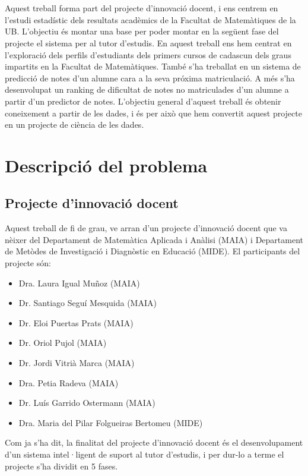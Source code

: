 \documentclass[12pt,a4paper,catalan]{article}
\begin{document}
\\
\\
Aquest treball forma part del projecte d'innovació docent, i ens centrem en l'estudi estadístic dels resultats acadèmics de la Facultat de Matemàtiques de la UB. L'objectiu és montar una base per poder montar en la següent fase del projecte el sistema per al tutor d'estudis. En aquest treball ens hem centrat en l'exploració dels perfils d'estudiants dels primers cursos de cadascun dels graus impartits en la Facultat de Matemàtiques. També s'ha treballat en un sistema de predicció de notes d'un alumne cara a la seva próxima matriculació. A més s'ha desenvolupat un ranking de dificultat de notes no matriculades d'un alumne a partir d'un predictor de notes. L'objectiu general d'aquest treball és obtenir coneixement a partir de les dades, i és per això que hem convertit aquest projecte en un projecte de ciència de les dades.


\newpage


\section{Descripció del problema}
\subsection{Projecte d'innovació docent}
Aquest treball de fi de grau, ve arran d'un projecte d'innovació docent \cite{pid} que va nèixer del Departament de Matemàtica Aplicada i Anàlisi (MAIA) i Departament de Metòdes de Investigació i Diagnòstic en Educació (MIDE). El participants del projecte són:
\begin{itemize}[leftmargin=.5in]
	\item Dra. Laura Igual Muñoz (MAIA)
	\item Dr. Santiago Seguí Mesquida (MAIA)
	\item Dr. Eloi Puertas Prats (MAIA)
	\item Dr. Oriol Pujol (MAIA)
	\item Dr. Jordi Vitrià Marca (MAIA)
	\item Dra. Petia Radeva (MAIA)
	\item Dr. Luís Garrido Ostermann (MAIA)
	\item Dra. Maria del Pilar Folgueiras Bertomeu (MIDE)
\end{itemize}

Com ja s'ha dit, la finalitat del projecte d'innovació docent és el desenvolupament d'un sistema intel·ligent de suport al tutor d'estudis, i per dur-lo a terme el projecte s'ha dividit en 5 fases.
\end{document}

